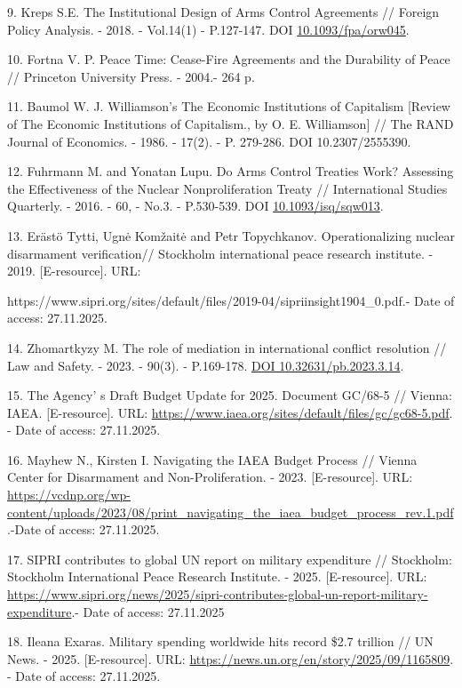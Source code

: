\begin{refs}
9. Kreps S.E. The Institutional Design of Arms Control Agreements //
Foreign Policy Analysis. - 2018. - Vol.14(1) - P.127-147. DOI
\href{https://doi.org/10.1093/fpa/orw045}{10.1093/fpa/orw045}.

10. Fortna V. P. Peace Time: Cease-Fire Agreements and the Durability of
Peace // Princeton University Press. - 2004.- 264 p.

11. Baumol W. J. Williamson's The Economic Institutions of Capitalism
{[}Review of The Economic Institutions of Capitalism., by O. E.
Williamson{]} // The RAND Journal of Economics. - 1986. - 17(2). - P.
279-286. DOI 10.2307/2555390.

12. Fuhrmann M. and Yonatan Lupu. Do Arms Control Treaties Work?
Assessing the Effectiveness of the Nuclear Nonproliferation Treaty //
International Studies Quarterly. - 2016. - 60, - No.3. - P.530-539.
DOI \href{https://doi.org/10.1093/isq/sqw013}{10.1093/isq/sqw013}.

13. Erästö Tytti, Ugnė Komžaitė and Petr Topychkanov. Operationalizing
nuclear disarmament verification// Stockholm international peace
research institute. - 2019. {[}E-resource{]}. URL:

https://www.sipri.org/sites/default/files/2019-04/sipriinsight1904\_0.pdf.-
Date of access: 27.11.2025.

14. Zhomartkyzy M. The role of mediation in international conflict
resolution // Law and Safety. - 2023. - 90(3). - P.169-178.
\href{https://doi.org/10.32631/pb.2023.3.14}{DOI 10.32631/pb.2023.3.14}.

15. The Agency' s Draft Budget Update for 2025. Document
GC/68-5 // Vienna: IAEA. {[}E-resource{]}. URL:
\url{https://www.iaea.org/sites/default/files/gc/gc68-5.pdf}. -
Date of access: 27.11.2025.

16. Mayhew N., Kirsten I. Navigating the IAEA Budget Process // Vienna
Center for Disarmament and Non-Proliferation. - 2023. {[}E-resource{]}.
URL:
\href{https://vcdnp.org/wp-content/uploads/2023/08/print_navigating_the_iaea_budget_process_rev.1.pdf}{https://vcdnp.org/wp-content/uploads/2023/08/print\_navigating\_the\_iaea\_budget\_process\_rev.1.pdf}
.-Date of access: 27.11.2025.

17. SIPRI contributes to global UN report on military expenditure //
Stockholm: Stockholm International Peace Research Institute. - 2025.
{[}E-resource{]}. URL:
\url{https://www.sipri.org/news/2025/sipri-contributes-global-un-report-military-expenditure}.-
Date of access: 27.11.2025

18. Ileana Exaras. Military spending worldwide hits record \$2.7
trillion // UN News. - 2025. {[}E-resource{]}. URL:
\url{https://news.un.org/en/story/2025/09/1165809}. - Date of
access: 27.11.2025.


\end{refs}
